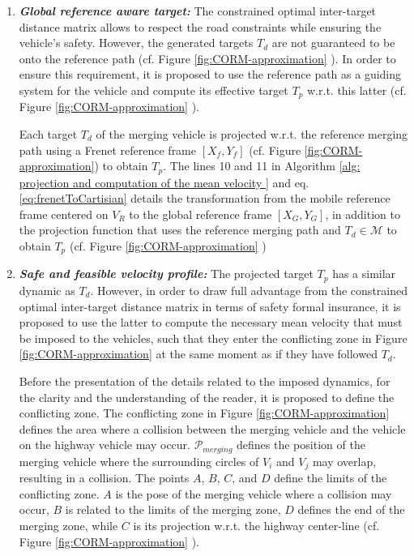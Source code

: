 \begin{enumerate}
    \item \textbf{\textit{Global reference aware target:}} The constrained optimal inter-target distance matrix allows to respect the road constraints while ensuring the vehicle's safety. However, the generated targets $T_d$ are not guaranteed to be onto the reference path (cf. Figure \ref{fig:CORM-approximation} ). In order to ensure this requirement, it is proposed to use the reference path as a guiding system for the vehicle and compute its effective target $T_p$ w.r.t. this latter (cf. Figure \ref{fig:CORM-approximation} ).

    Each target $T_d$ of the merging vehicle is projected w.r.t. the reference merging path using a Frenet reference frame $[X_f,Y_f]$ (cf. Figure \ref{fig:CORM-approximation}) to obtain $T_p$. The lines 10 and 11 in Algorithm \ref{alg: projection and computation of the mean velocity } and eq. \ref{eq:frenetToCartisian} details the transformation from the mobile reference frame centered on $V_R$ to the global reference frame $[X_G,Y_G]$, in addition to the projection function that uses the reference merging path and $T_d \in \mathcal{M}$ to obtain $T_p$ (cf. Figure \ref{fig:CORM-approximation} )


    \item \textbf{\textit{Safe and feasible velocity profile:}} The projected target $T_p$ has a similar dynamic as $T_d$. However, in order to draw full advantage from the constrained optimal inter-target distance matrix in terms of safety formal insurance, it is proposed to use the latter to compute the necessary mean velocity that must be imposed to the vehicles, such that they enter the conflicting zone in Figure \ref{fig:CORM-approximation}  at the same moment as if they have followed $T_d$. 

    Before the presentation of the details related to the imposed dynamics, for the clarity and the understanding of the reader, it is proposed to define the conflicting zone. The conflicting zone in  Figure \ref{fig:CORM-approximation}  defines the area where a collision between the merging vehicle and the vehicle on the highway vehicle may occur. $\mathcal{P}_{merging}$ defines the position of the merging vehicle where the surrounding circles of $V_i$ and $V_j$ may overlap, resulting in a collision. The points $A$, $B$, $C$, and $D$ define the limits of the conflicting zone. $A$ is the pose of the merging vehicle where a collision may occur, $B$ is related to the limits of the merging zone, $D$ defines the end of the merging zone, while $C$ is its projection w.r.t. the highway center-line (cf. Figure \ref{fig:CORM-approximation} ). 



\end{enumerate}
